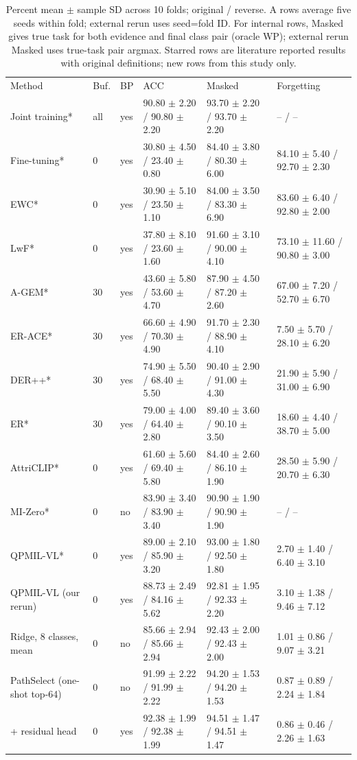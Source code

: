 \begin{table}
\centering
\caption{Percent mean $\pm$ sample SD across 10 folds; original / reverse. A rows average five seeds within fold; external rerun uses seed=fold ID. For internal rows, Masked gives true task for both evidence and final class pair (oracle WP); external rerun Masked uses true-task pair argmax. Starred rows are literature reported results with original definitions; new rows from this study only.}
\begin{tabular}{llllll}
\hline
Method & Buf. & BP & ACC & Masked & Forgetting \\
Joint training* & all & yes & 90.80 $\pm$ 2.20 / 90.80 $\pm$ 2.20 & 93.70 $\pm$ 2.20 / 93.70 $\pm$ 2.20 & -- / -- \\
Fine-tuning* & 0 & yes & 30.80 $\pm$ 4.50 / 23.40 $\pm$ 0.80 & 84.40 $\pm$ 3.80 / 80.30 $\pm$ 6.00 & 84.10 $\pm$ 5.40 / 92.70 $\pm$ 2.30 \\
EWC* & 0 & yes & 30.90 $\pm$ 5.10 / 23.50 $\pm$ 1.10 & 84.00 $\pm$ 3.50 / 83.30 $\pm$ 6.90 & 83.60 $\pm$ 6.40 / 92.80 $\pm$ 2.00 \\
LwF* & 0 & yes & 37.80 $\pm$ 8.10 / 23.60 $\pm$ 1.60 & 91.60 $\pm$ 3.10 / 90.00 $\pm$ 4.10 & 73.10 $\pm$ 11.60 / 90.80 $\pm$ 3.00 \\
A-GEM* & 30 & yes & 43.60 $\pm$ 5.80 / 53.60 $\pm$ 4.70 & 87.90 $\pm$ 4.50 / 87.20 $\pm$ 2.60 & 67.00 $\pm$ 7.20 / 52.70 $\pm$ 6.70 \\
ER-ACE* & 30 & yes & 66.60 $\pm$ 4.90 / 70.30 $\pm$ 4.90 & 91.70 $\pm$ 2.30 / 88.90 $\pm$ 4.10 & 7.50 $\pm$ 5.70 / 28.10 $\pm$ 6.20 \\
DER++* & 30 & yes & 74.90 $\pm$ 5.50 / 68.40 $\pm$ 5.50 & 90.40 $\pm$ 2.90 / 91.00 $\pm$ 4.30 & 21.90 $\pm$ 5.90 / 31.00 $\pm$ 6.90 \\
ER* & 30 & yes & 79.00 $\pm$ 4.00 / 64.40 $\pm$ 2.80 & 89.40 $\pm$ 3.60 / 90.10 $\pm$ 3.50 & 18.60 $\pm$ 4.40 / 38.70 $\pm$ 5.00 \\
AttriCLIP* & 0 & yes & 61.60 $\pm$ 5.60 / 69.40 $\pm$ 5.80 & 84.40 $\pm$ 2.60 / 86.10 $\pm$ 1.90 & 28.50 $\pm$ 5.90 / 20.70 $\pm$ 6.30 \\
MI-Zero* & 0 & no & 83.90 $\pm$ 3.40 / 83.90 $\pm$ 3.40 & 90.90 $\pm$ 1.90 / 90.90 $\pm$ 1.90 & -- / -- \\
QPMIL-VL* & 0 & yes & 89.00 $\pm$ 2.10 / 85.90 $\pm$ 3.20 & 93.00 $\pm$ 1.80 / 92.50 $\pm$ 1.80 & 2.70 $\pm$ 1.40 / 6.40 $\pm$ 3.10 \\
QPMIL-VL (our rerun) & 0 & yes & 88.73 $\pm$ 2.49 / 84.16 $\pm$ 5.62 & 92.81 $\pm$ 1.95 / 92.33 $\pm$ 2.20 & 3.10 $\pm$ 1.38 / 9.46 $\pm$ 7.12 \\
Ridge, 8 classes, mean & 0 & no & 85.66 $\pm$ 2.94 / 85.66 $\pm$ 2.94 & 92.43 $\pm$ 2.00 / 92.43 $\pm$ 2.00 & 1.01 $\pm$ 0.86 / 9.07 $\pm$ 3.21 \\
PathSelect (one-shot top-64) & 0 & no & 91.99 $\pm$ 2.22 / 91.99 $\pm$ 2.22 & 94.20 $\pm$ 1.53 / 94.20 $\pm$ 1.53 & 0.87 $\pm$ 0.89 / 2.24 $\pm$ 1.84 \\
+ residual head & 0 & yes & 92.38 $\pm$ 1.99 / 92.38 $\pm$ 1.99 & 94.51 $\pm$ 1.47 / 94.51 $\pm$ 1.47 & 0.86 $\pm$ 0.46 / 2.26 $\pm$ 1.63 \\
\hline
\end{tabular}
\end{table}
